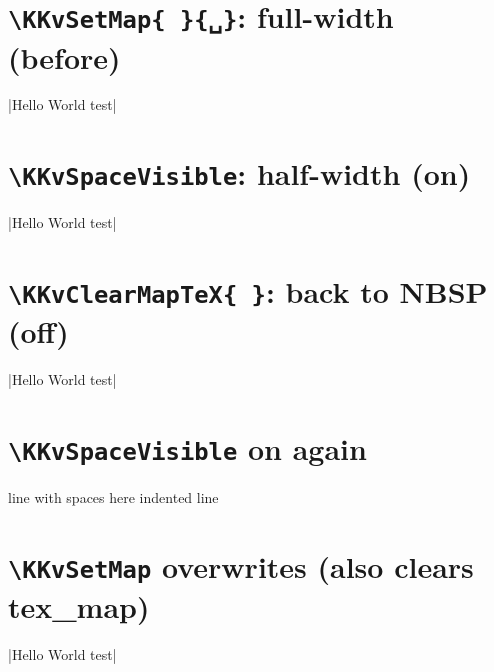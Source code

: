 \documentclass{ltjsarticle}
\begin{document}
\section*{\texttt{\textbackslash KKvSetMap\{ \}\{␣\}}: full-width (before)}
\KKverb|Hello World test|

\section*{\texttt{\textbackslash KKvSpaceVisible}: half-width (on)}
\KKvSpaceVisible
\KKverb|Hello World test|

\section*{\texttt{\textbackslash KKvClearMapTeX\{ \}}: back to NBSP (off)}
\KKvClearMapTeX{ }
\KKverb|Hello World test|

\section*{\texttt{\textbackslash KKvSpaceVisible} on again}
\KKvSpaceVisible
\KKcodeS
line with spaces here
  indented line
\KKcodeE

\section*{\texttt{\textbackslash KKvSetMap} overwrites (also clears tex\_map)}
\KKverb|Hello World test|
\end{document}
